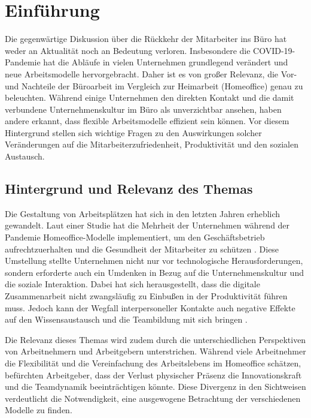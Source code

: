 \section{Einführung}

Die gegenwärtige Diskussion über die Rückkehr der Mitarbeiter ins Büro hat weder an Aktualität noch an Bedeutung verloren. Insbesondere die COVID-19-Pandemie hat die Abläufe in vielen Unternehmen grundlegend verändert und neue Arbeitsmodelle hervorgebracht. Daher ist es von großer Relevanz, die Vor- und Nachteile der Büroarbeit im Vergleich zur Heimarbeit (Homeoffice) genau zu beleuchten. Während einige Unternehmen den direkten Kontakt und die damit verbundene Unternehmenskultur im Büro als unverzichtbar ansehen, haben andere erkannt, dass flexible Arbeitsmodelle effizient sein können. Vor diesem Hintergrund stellen sich wichtige Fragen zu den Auswirkungen solcher Veränderungen auf die Mitarbeiterzufriedenheit, Produktivität und den sozialen Austausch.

\subsection{Hintergrund und Relevanz des Themas}

Die Gestaltung von Arbeitsplätzen hat sich in den letzten Jahren erheblich gewandelt. Laut einer Studie hat die Mehrheit der Unternehmen während der Pandemie Homeoffice-Modelle implementiert, um den Geschäftsbetrieb aufrechtzuerhalten und die Gesundheit der Mitarbeiter zu schützen \cite{file1}. Diese Umstellung stellte Unternehmen nicht nur vor technologische Herausforderungen, sondern erforderte auch ein Umdenken in Bezug auf die Unternehmenskultur und die soziale Interaktion. Dabei hat sich herausgestellt, dass die digitale Zusammenarbeit nicht zwangsläufig zu Einbußen in der Produktivität führen muss. Jedoch kann der Wegfall interpersoneller Kontakte auch negative Effekte auf den Wissensaustausch und die Teambildung mit sich bringen \cite{file2}.

Die Relevanz dieses Themas wird zudem durch die unterschiedlichen Perspektiven von Arbeitnehmern und Arbeitgebern unterstrichen. Während viele Arbeitnehmer die Flexibilität und die Vereinfachung des Arbeitslebens im Homeoffice schätzen, befürchten Arbeitgeber, dass der Verlust physischer Präsenz die Innovationskraft und die Teamdynamik beeinträchtigen könnte. Diese Divergenz in den Sichtweisen verdeutlicht die Notwendigkeit, eine ausgewogene Betrachtung der verschiedenen Modelle zu finden.

